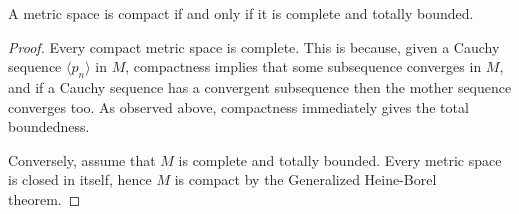 \begin{cor}
  A metric space is compact if and only if it is complete and totally bounded.
\end{cor}

\begin{proof}
  Every compact metric space is complete.
  This is because, given a Cauchy sequence $\langle p_n \rangle$ in $M$, compactness implies that some subsequence converges in $M$, and if a Cauchy sequence has a convergent subsequence then the mother sequence converges too.
  As observed above, compactness immediately gives the total boundedness.

  Conversely, assume that $M$ is complete and totally bounded.
  Every metric space is closed in itself, hence $M$ is compact by the Generalized Heine-Borel theorem.
\end{proof}
